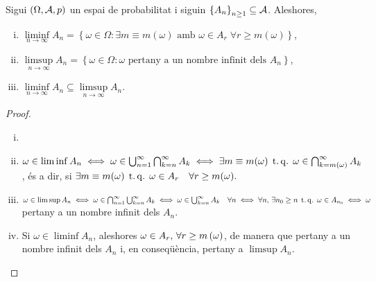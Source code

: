 \begin{prop}
    Sigui $\left(\Omega,\mathcal{A},p\right)$ un espai de probabilitat i siguin $\left\{ A_n\right\}_{n\geq1} \subseteq \mathcal{A}$. Aleshores,
    \begin{enumerate}[i)]
        \item $\liminf\limits_{n\to\infty} A_n= \left\{\omega\in\Omega\colon \exists m\equiv m(\omega) \text{ amb } \omega\in A_r \;\forall r\geq m(\omega)\right\}$,
        \item $\limsup\limits_{n\to\infty} A_n= \left\{\omega\in\Omega \colon \omega \text{ pertany a un nombre infinit dels } A_n\right\}$,
        \item $\liminf\limits_{n\to\infty} A_n \subseteq \limsup\limits_{n\to\infty} A_n$.
    \end{enumerate}
\end{prop}
\begin{proof}
    \begin{enumerate}[i)]
        \item[]
        \item $\omega\in\liminf{A_n} \iff \omega\in\bigcup_{n=1}^{\infty}\bigcap_{k=n}^{\infty} A_k \iff
        \exists m \equiv m(\omega) \operatorname{\;t.q.\;} \omega\in\bigcap_{k=m(\omega)}^{\infty} A_k$,
        \'es a dir, si $\exists m \equiv m(\omega) \operatorname{\;t.q.\;} \omega\in A_r 
        \quad\forall r \ge m(\omega).$
        \item $\omega\in\limsup{A_n} \iff \omega\in\bigcap_{n=1}^{\infty}\bigcup_{k=n}^{\infty} A_k \iff
        \omega\in\bigcup_{k=n}^{\infty}A_k \quad\forall n \iff \forall n,\, \exists n_0\geq n \operatorname{\;t.q.\;} \omega\in A_{n_0}\iff \omega$ pertany a un nombre infinit dels $A_n$. 
        \item Si $\omega\in\liminf A_n$, aleshores $\omega\in A_r, \, \forall r\geq m\left(\omega\right)$, de manera que pertany a un nombre infinit dels $A_n$ i, en conseqüència, pertany a $\limsup A_n$.
    \end{enumerate}
\end{proof}

